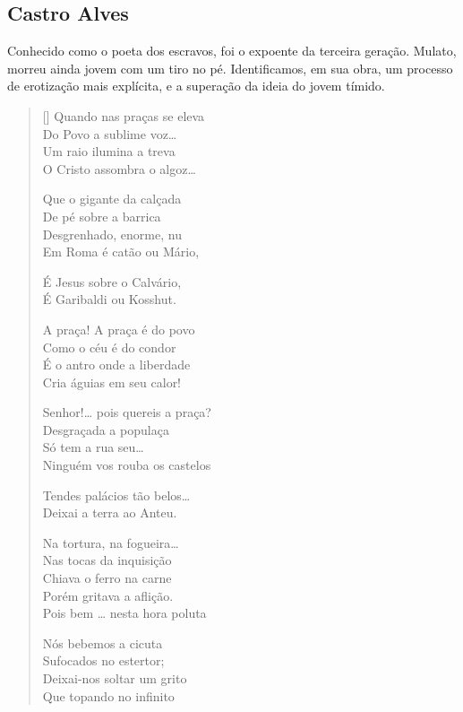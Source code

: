 \documentclass[12pt]{book}
\begin{document}
				\subsection{Castro Alves}
				\par Conhecido como o poeta dos escravos, foi o expoente da terceira geração. Mulato, morreu ainda jovem com um tiro no pé. Identificamos, em sua obra, um processo de erotização mais explícita, e a superação da ideia do jovem tímido.
				\settowidth{\versewidth}{Do Povo a sublime voz… }
				\begin{verse}[\versewidth]
					Quando nas praças se eleva \\
					Do Povo a sublime voz… \\
					Um raio ilumina a treva \\
					O Cristo assombra o algoz…
					
					Que o gigante da calçada \\
					De pé sobre a barrica \\
					Desgrenhado, enorme, nu \\
					Em Roma é catão ou Mário, 
					
					É Jesus sobre o Calvário, \\
					É Garibaldi ou Kosshut.
					
					A praça! A praça é do povo \\
					Como o céu é do condor\\
					É o antro onde a liberdade \\
					Cria águias em seu calor! 
					
					Senhor!… pois quereis a praça? \\
					Desgraçada a populaça \\
					Só tem a rua seu… \\
					Ninguém vos rouba os castelos
					
					Tendes palácios tão belos… \\
					Deixai a terra ao Anteu.
					
					Na tortura, na fogueira… \\
					Nas tocas da inquisição \\
					Chiava o ferro na carne \\
					Porém gritava a aflição. \\
					Pois bem … nesta hora poluta 
					
					Nós bebemos a cicuta \\
					Sufocados no estertor; \\
					Deixai-nos soltar um grito\\
					Que topando no infinito 
					

\end{verse}
\end{document}
